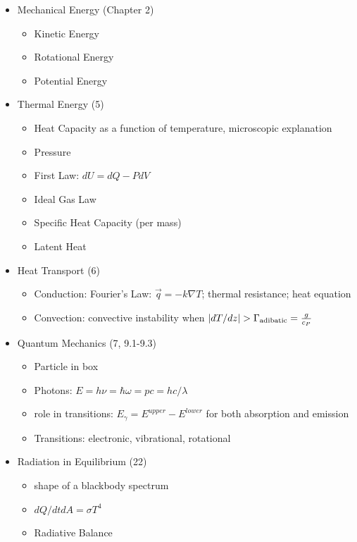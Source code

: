 \documentclass[11pt]{book}
\newcommand\bei{\begin{itemize}}
\newcommand\eei{\end{itemize}}
\begin{document}
\bei 
\item Mechanical Energy (Chapter 2)
\bei
\item Kinetic Energy
\item Rotational Energy
\item Potential Energy
\eei
\item Thermal Energy (5)
\bei
\item Heat Capacity as a function of temperature, microscopic explanation
\item Pressure
\item First Law: $dU=dQ-PdV$
\item Ideal Gas Law
\item Specific Heat Capacity (per mass)
\item Latent Heat
\eei
\item Heat Transport (6)
\bei
\item Conduction: Fourier's Law: $\vec q = -k\nabla T$; thermal resistance; heat equation
\item Convection: convective instability when $\vert dT/dz\vert > \Gamma_{\rm adibatic} =\frac{g}{c_P}$
\eei
\item Quantum Mechanics (7, 9.1-9.3)
\bei
\item Particle in box
\item Photons: $E=h\nu=\hbar\omega=pc=hc/\lambda$
\item role in transitions: $E_\gamma=E^{upper}-E^{lower}$ for both absorption and emission
\item Transitions: electronic, vibrational, rotational
\eei
\item Radiation in Equilibrium (22)
\bei 
\item shape of a blackbody spectrum 
\item $dQ/dt dA = \sigma T^4$
\item Radiative Balance
\eei
\eei
\end{document}
